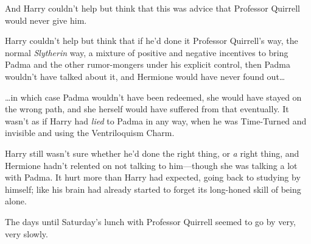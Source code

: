 And Harry couldn't help but think that this was advice that Professor Quirrell 
would never give him.

Harry couldn't help but think that if he'd done it Professor Quirrell's way, 
the normal \emph{Slytherin} way, a mixture of positive and negative incentives 
to bring Padma and the other rumor-mongers under his explicit control, then 
Padma wouldn't have talked about it, and Hermione would have never found 
out{\ldots}

{\ldots}in which case Padma wouldn't have been redeemed, she would have stayed 
on the wrong path, and she herself would have suffered from that eventually. It 
wasn't as if Harry had \emph{lied} to Padma in any way, when he was Time-Turned 
and invisible and using the Ventriloquism Charm.

Harry still wasn't sure whether he'd done the right thing, or \emph{a} right 
thing, and Hermione hadn't relented on not talking to him---though she was 
talking a lot with Padma. It hurt more than Harry had expected, going back to 
studying by himself; like his brain had already started to forget its 
long-honed skill of being alone.

The days until Saturday's lunch with Professor Quirrell seemed to go by very, 
very slowly.